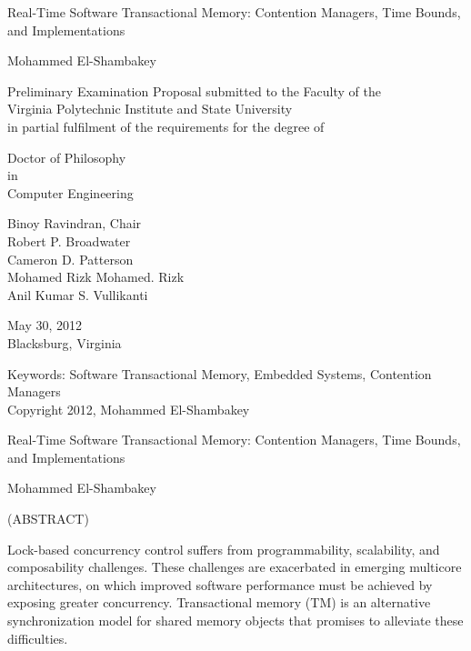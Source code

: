 \documentclass[12pt,english]{report}
\begin{document}
\thispagestyle{empty}
\begin{center}

{\Large 
Real-Time Software Transactional Memory: Contention Managers, Time Bounds, and Implementations
}

\vfill

Mohammed El-Shambakey

\vfill

Preliminary Examination Proposal submitted to the Faculty of the \\
Virginia Polytechnic Institute and State University \\
in partial fulfilment of the requirements for the degree of

\vfill

Doctor of Philosophy \\
in \\
Computer Engineering

\vfill

Binoy Ravindran, Chair \\
Robert P. Broadwater \\
Cameron D. Patterson \\
Mohamed Rizk Mohamed. Rizk\\
Anil Kumar S. Vullikanti

\vfill

May 30, 2012\\
Blacksburg, Virginia

\vfill

Keywords: Software Transactional Memory, Embedded Systems, Contention Managers
\\
Copyright 2012, Mohammed El-Shambakey

\end{center}

\pagebreak

\thispagestyle{empty}
\begin{center}

{\large Real-Time Software Transactional Memory: Contention Managers, Time Bounds, and Implementations}

\vfill

Mohammed El-Shambakey

\vfill

(ABSTRACT)

\vfill

\end{center}

Lock-based concurrency control suffers from programmability, scalability, and composability  challenges. These challenges are exacerbated in emerging multicore architectures, on which improved software performance must be achieved by exposing greater concurrency.   Transactional memory (TM) is an alternative synchronization model for shared memory objects that promises to alleviate these difficulties. 
\end{document}
